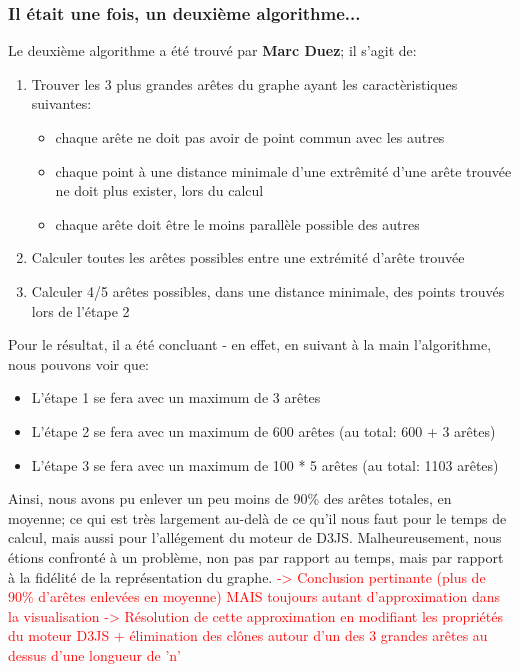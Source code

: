 \documentclass{report}
\begin{document}
\subsubsection{Il était une fois, un deuxième algorithme...}
Le deuxième algorithme a été trouvé par \textbf{Marc Duez}; il s'agit de:
\begin{enumerate}
\item Trouver les 3 plus grandes arêtes du graphe ayant les caractèristiques suivantes:
	\begin{itemize}
	\item chaque arête ne doit pas avoir de point commun avec les autres
	\item chaque point à une distance minimale d'une extrêmité d'une arête trouvée ne doit plus exister, lors du calcul
	\item chaque arête doit être le moins parallèle possible des autres
	\end{itemize}
\item Calculer toutes les arêtes possibles entre une extrémité d'arête trouvée
\item Calculer 4/5 arêtes possibles, dans une distance minimale, des points trouvés lors de l'étape 2
\end{enumerate}
Pour le résultat, il a été concluant - en effet, en suivant à la main l'algorithme, nous pouvons voir que:
\begin{itemize}
\item L'étape 1 se fera avec un maximum de 3 arêtes
\item L'étape 2 se fera avec un maximum de 600 arêtes (au total: 600 + 3 arêtes)
\item L'étape 3 se fera avec un maximum de 100 * 5 arêtes (au total: 1103 arêtes)
\end{itemize}
Ainsi, nous avons pu enlever un peu moins de 90\% des arêtes totales, en moyenne; ce qui est très largement au-delà de ce qu'il nous faut pour le temps de calcul, mais aussi pour l'allégement du moteur de D3JS.
\newline
Malheureusement, nous étions confronté à un problème, non pas par rapport au temps, mais par rapport à la fidélité de la représentation du graphe.
\textcolor{red}{-> Conclusion pertinante (plus de 90\% d'arêtes enlevées en moyenne) MAIS toujours autant d'approximation dans la visualisation}
\newline
\textcolor{red}{-> Résolution de cette approximation en modifiant les propriétés du moteur D3JS + élimination des clônes autour d'un des 3 grandes arêtes au dessus d'une longueur de 'n'}
\newline
\end{document}
